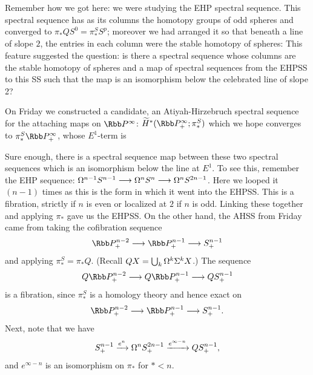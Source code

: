 Remember how we got here: we were studying the EHP spectral sequence.  This spectral sequence has as its columns the homotopy groups of odd spheres and converged to $\pi_* QS^0 = \pi_*^S S^p$; moreover we had arranged it so that beneath a line of slope $2$, the entries in each column were the stable homotopy of spheres:   This feature suggested the question: is there a spectral sequence whose columns are the stable homotopy of spheres and a map of spectral sequences from the EHPSS to this SS such that the map is an isomorphism below the celebrated line of slope 2?

On Friday we constructed a candidate, an Atiyah-Hirzebruch spectral sequence for the attaching maps on $\RP^\infty$: $\widetilde H^*(\RP^\infty_+; \pi_*^S)$ which we hope converges to $\pi_*^S \RP^\infty_+$, whose $E^1$-term is 

Sure enough, there is a spectral sequence map between these two spectral sequences which is an isomorphism below the line at $E^1$.  To see this, remember the EHP sequence: $\Omega^{n-1} S^{n-1} \longrightarrow \Omega^n S^n \longrightarrow \Omega^n S^{2n-1}$.  Here we looped it $(n-1)$ times as this is the form in which it went into the EHPSS.  This is a fibration, strictly if $n$ is even or localized at $2$ if $n$ is odd.  Linking these together and applying $\pi_*$ gave us the EHPSS.  On the other hand, the AHSS from Friday came from taking the cofibration sequence \[\RP^{n-2}_+ \to \RP^{n-1}_+ \to S^{n-1}_+\] and applying $\pi_*^S = \pi_* Q$.  (Recall $QX = \bigcup_k \Omega^k \Sigma^k X$.)  The sequence \[Q\RP^{n-2}_+ \to Q\RP^{n-1}_+ \to QS^{n-1}_+\] is a fibration, since $\pi_*^S$ is a homology theory and hence exact on \[\RP^{n-2}_+ \to \RP^{n-1}_+ \to S^{n-1}_+.\]  Next, note that we have \[S^{n-1}_+ \xrightarrow{e^n} \Omega^n S^{2n-1}_+ \xrightarrow{e^{\infty-n}} QS^{n-1}_+,\] and $e^{\infty-n}$ is an isomorphism on $\pi_*$ for $* < n$.

